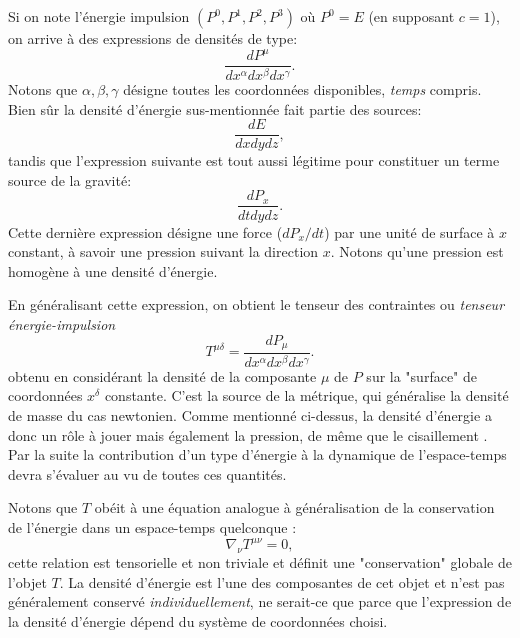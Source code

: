 Si on note l'énergie impulsion $(P^0,P^1,P^2,P^3)$ où $P^0=E$ (en supposant $c=1$), on arrive à des expressions de densités de type:
\begin{equation}
\frac{dP^\mu}{dx^\alpha dx^\beta dx^\gamma}.
\end{equation}
Notons que $\alpha,\beta,\gamma$ désigne toutes les coordonnées disponibles, \textit{temps} compris. Bien sûr la densité d'énergie sus-mentionnée fait partie des sources:
\begin{equation}
\frac{dE}{dx dy dz},
\end{equation}
tandis que l'expression suivante est tout aussi légitime pour constituer un terme source de la gravité:
\begin{equation}
\frac{dP_x}{dtdydz}.
\end{equation}
Cette dernière expression désigne une force ($dP_x/dt$) par une unité de surface à $x$ constant, à savoir une pression suivant la direction $x$. Notons qu'une pression est homogène à une densité d'énergie.

En généralisant cette expression, on obtient le tenseur des contraintes ou \textit{tenseur énergie-impulsion}
\begin{equation}
T^{\mu\delta} = \frac{dP_\mu}{dx^\alpha dx^\beta dx^\gamma}.
\end{equation}
obtenu en considérant la densité de la composante $\mu$ de $P$ sur la "surface" de coordonnées $x^\delta$ constante. C'est la source de la métrique, qui généralise la densité de masse du cas newtonien.  Comme mentionné ci-dessus, la densité d'énergie a donc un rôle à jouer mais également la pression, de même que le cisaillement . Par la suite la contribution d'un type d'énergie à la dynamique de l'espace-temps devra s'évaluer au vu de toutes ces quantités. 

Notons que $T$ obéit à une équation analogue à généralisation de la conservation de l'énergie dans un espace-temps quelconque : 
 \begin{equation}
 \nabla_\nu T^{\mu\nu}=0,
 \label{e:divT}
 \end{equation}
 cette relation est tensorielle et non triviale et définit une "conservation" globale de l'objet $T$. La densité d'énergie est l'une des composantes de cet objet et n'est pas généralement conservé \textit{individuellement}, ne serait-ce que parce que l'expression de la densité d'énergie dépend du système de coordonnées choisi.

